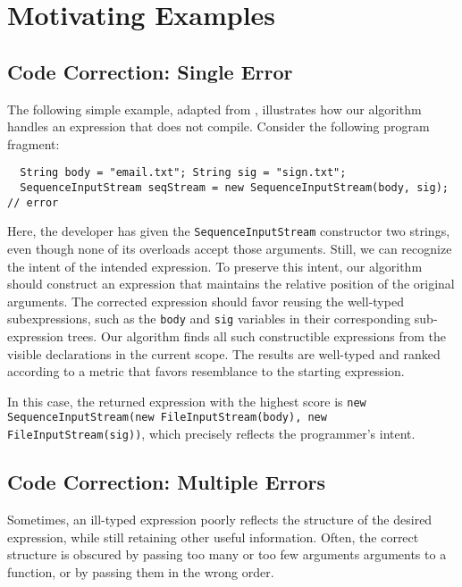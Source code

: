 \section{Motivating Examples}
\label{sec:examples}

\subsection{Code Correction: Single Error}
\label{sec:examples:single}
The following simple example, adapted from \cite{GveroETAL13CompleteCompletionTypesWeights}, illustrates how our algorithm handles an expression that does not compile. Consider the following program fragment:
\begin{lstlisting}
  String body = "email.txt"; String sig = "sign.txt";
  SequenceInputStream seqStream = new SequenceInputStream(body, sig); // error
\end{lstlisting}
Here, the developer has given the \lstinline{SequenceInputStream} constructor two strings, even though none of its overloads accept those arguments. Still, we can recognize the intent of the intended expression. To preserve this intent, our algorithm should construct an expression that maintains the relative position of the original arguments. The corrected expression should favor reusing the well-typed subexpressions, such as the \lstinline{body} and \lstinline{sig} variables in their corresponding sub-expression trees. Our algorithm finds all such constructible expressions from the visible declarations in the current scope. The results are well-typed and ranked according to a metric that favors resemblance to the starting expression.

In this case, the returned expression with the highest score is \lstinline{new SequenceInputStream(new FileInputStream(body), new FileInputStream(sig))}, which precisely reflects the programmer's intent.

\subsection{Code Correction: Multiple Errors}
\label{sec:examples:multiple}
Sometimes, an ill-typed expression poorly reflects the structure of the desired expression, while still retaining other useful information. Often, the correct structure is obscured by passing too many or too few arguments arguments to a function, or by passing them in the wrong order.

